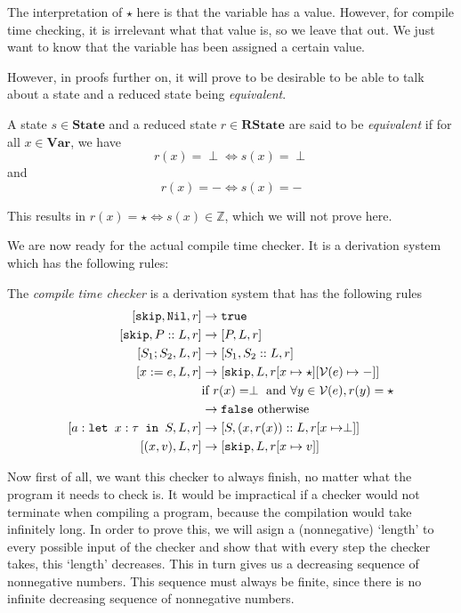 The interpretation of $\star$ here is that the variable has a value. However, for compile time checking, it is irrelevant what that value is, so we leave that out. We just want to know that the variable has been assigned a certain value.

However, in proofs further on, it will prove to be desirable to be able to talk about a state and a reduced state being \emph{equivalent}.

\begin{definition}
A state $s\in\textbf{State}$ and a reduced state $r\in\textbf{RState}$ are said to be \emph{equivalent} if for all $x\in\textbf{Var}$, we have 
$$r(x) = \perp \iff s(x) = \perp$$
and
$$r(x) = - \iff s(x) = -$$
\end{definition}

This results in $r(x) = \star \iff s(x)\in \mathbb{Z}$, which we will not prove here. 

We are now ready for the actual compile time checker. It is a derivation system which has the following rules:

\begin{definition}
\label{compiletimechecker}
The \emph{compile time checker} is a derivation system that has the following rules
\begin{align*}
\cc{\texttt{skip}}{\texttt{Nil}}{r} & \to \texttt{true}  \\
\cc{\texttt{skip}} {P::L}{ r}       & \to \cc{P}{L}{r}  \\
\cc{S_1; S_2}{L}{r}                 & \to \cc{S_1}{S_2::L}{r}  \\
\cc{x:=e}{L}{r}                     & \to \cc{\texttt{skip}}{L}{r[x\mapsto \star][\mathcal{V}(e) \mapsto -]} \\
                                    & \textrm{if }r(x) = \perp \textrm{ and } \forall y \in \mathcal{V}(e), r(y) = \star \\
                                    & \to \texttt{false} \textrm{ otherwise}\\
\cc{\letm{x}{S}}{L}{r} & \to \cc{S}{(x,r(x))::L}{r[x\mapsto \perp]} \\
\cc{(x,v)}{L}{r}                    & \to \cc{\texttt{skip}}{L}{r[x \mapsto v]}
\end{align*}
\end{definition}

Now first of all, we want this checker to always finish, no matter what the program it needs to check is. It would be impractical if a checker would not terminate when compiling a program, because the compilation would take infinitely long. In order to prove this, we will asign a (nonnegative) `length' to every possible input of the checker and show that with every step the checker takes, this `length' decreases. This in turn gives us a decreasing sequence of nonnegative numbers. This sequence must always be finite, since there is no infinite decreasing sequence of nonnegative numbers. 

